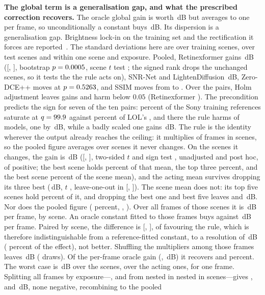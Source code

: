 \noindent\textbf{The global term is a generalisation gap, and what the prescribed correction recovers.} The oracle global gain is worth \nHRglob{}\,dB but averages to one per frame, so unconditionally a constant buys \nCconstPool{}\,dB. Its dispersion is a generalisation gap. Brightness lock-in on the training set and the rectification it forces are reported~\cite{clerwkv2026,mill2025}. The standard deviations here are \nAGENtrain{} over training scenes, \nAGENtest{} over test scenes and \nAGENwithin{} within one scene and exposure. Pooled, Retinexformer gains \nFRetgain{}\,dB ([\nFRetlo{}, \nFRethi{}], bootstrap $p=0.0005{}$, scene $t$ test \nFptt{}; the signed rank \nFpwil{} drops the \nFnoopSc{} unchanged scenes, so it tests the \nFactSc{} the rule acts on), SNR-Net \nFSnrgain{} and LightenDiffusion \nFLdgain{}\,dB, Zero-DCE++ moves \nFZdcegain{} at $p=0.5263{}$, and SSIM moves from \nFRetssa{} to \nFRetssb{}. Over the \nFholmM{} pairs, Holm adjustment leaves \nFholmPos{} gains and \nFholmNeg{} harm below $0.05$ (Retinexformer \nFholmRet{}). The precondition predicts the sign for seven of the ten pairs: \nFsatS{} percent of the \nQSATn{} Sony training references saturate at $q=99.9{}$ against \nFsatLall{} percent of LOL's \nFlolNimg{}, and there the rule harms \nFlolBad{} of \nFlolN{} models, one by \nFlolWorst{}\,dB, while a badly scaled one gains \nFlolBest{}\,dB. The rule is the identity wherever the output already reaches the ceiling: it multiplies \nFRetact{} of \nNIMG{} frames in \nFactSc{} scenes, so the pooled figure averages over scenes it never changes. On the scenes it changes, the gain is \nFactGain{}\,dB ([\nFactLo{}, \nFactHi{}], two-sided $t$ \nFactT{} and sign test \nFactSign{}, unadjusted and post hoc, \nFactPos{} of \nFactSc{} positive; the best scene holds \nFbestAct{} percent of that mean, the top three \nFtopthreeAct{} percent, and the best scene \nFbestPool{} percent of the scene mean), and the acting mean survives dropping its three best (\nFdropTop{}\,dB, $t$ \nFdropT{}, leave-one-out in [\nFjkLo{}, \nFjkHi{}]). The scene mean does not: its top five scenes hold \nCONtopfive{} percent of it, and dropping the best one and best five leaves \nCONone{} and \nCONfive{}\,dB. Nor does the pooled figure (\nCONtopfiveFr{} percent, \nCONoneFr{}, \nCONfiveFr{}). Over all frames of those scenes it is \nFactAllFr{}\,dB per frame, \nFactAll{} by scene. An oracle constant fitted to those frames buys \nCconstAct{} against \nCanchActFr{}\,dB per frame. Paired by scene, the difference is \nCpair{} [\nCpairLo{}, \nCpairHi{}], \nCpairPos{} of \nFactSc{} favouring the rule, which is therefore indistinguishable from a reference-fitted constant, to a resolution of \nCTOST{}\,dB (\nCTOSTpct{} percent of the effect), not better. Shuffling the multipliers among those frames leaves \nCperm{}\,dB (\nCpermN{} draws). Of the per-frame oracle gain (\nCoraPool{}, \nCoraAct{}\,dB) it recovers \nCrecPool{} and \nCrecAct{} percent. The worst case is \nFwScene{}\,dB over the \nNSCENE{} scenes, \nFwAct{} over the acting ones, \nFwFrame{} for one frame. Splitting all \nNIMG{} frames by exposure---\nFexns{}, \nFexnm{} and \nFexnl{} from \nFexscs{} nested in \nFexscm{} nested in \nFexscl{} scenes---gives \nFexfs{}, \nFexfm{} and \nFexfl{}\,dB, none negative, recombining to the pooled 